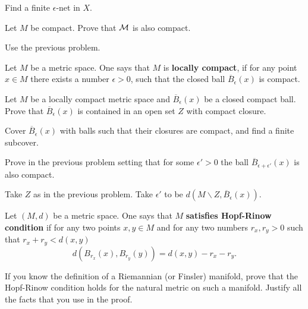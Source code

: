 \documentclass[12pt]{article}
\begin{document}
\begin{ukazanie} Find a finite $\epsilon$-net in $X$.
\end{ukazanie}

\begin{zadacha}[*] Let $M$ be compact. Prove that $\cal M$ is also
  compact.
\end{zadacha}

\begin{ukazanie} Use the previous problem.
\end{ukazanie}

\begin{opredelenie} Let $M$ be a metric space.
One says that $M$ is {\bf locally compact}, if for any point 
$x\in M$ there exists a number $\epsilon>0$, such that the closed ball
$\overline{B}_\epsilon(x)$ is compact.
\end{opredelenie}

\begin{zadacha} Let $M$ be a locally compact metric space
and $\overline{B}_\epsilon(x)$ be a closed compact ball. Prove that 
$\overline{B}_\epsilon(x)$ is contained in an open set $Z$ with compact
closure.
\end{zadacha}

\begin{ukazanie} Cover $\overline B_\epsilon(x)$ with balls such that
  their closures are compact, and find a finite subcover.
\end{ukazanie}

\begin{zadacha}[!] Prove in the previous problem setting that for some
  $\epsilon'> 0$ the ball $\overline{B}_{\epsilon+\epsilon'}(x)$ is
  also compact.
\end{zadacha}

\begin{ukazanie} Take $Z$ as in the previous problem. Take $\epsilon'$
  to be $d (M \backslash Z, \overline B_\epsilon(x))$.
\end{ukazanie}

\begin{opredelenie} Let $(M, d)$ be a metric space.
One says that $M$ {\bf satisfies Hopf-Rinow condition} if 
for any two points $x, y\in M$ and for any two numbers $r_x, r_y >0$
such that $r_x+r_y < d(x,y)$ 
$$
d(B_{r_x}(x), B_{r_y}(y)) = d(x,y) - r_x-r_y.
$$
\end{opredelenie}

\begin{zadacha}[**] If you know the definition of a Riemannian (or
  Finsler) manifold, prove that the Hopf-Rinow condition holds for the
  natural metric on such a manifold. Justify all the facts that you
  use in the proof.
\end{zadacha}
\end{document}
